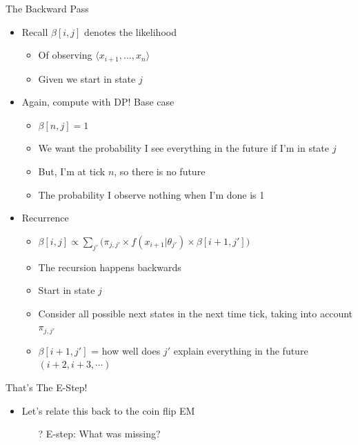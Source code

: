 \documentclass[aspectratio=169]{beamer}
\begin{document}
\begin{frame}{The Backward Pass}

\begin{itemize}
\item Recall $\beta[i,j]$ denotes the likelihood
	\begin{itemize}
	\item Of observing $\langle x_{i+1}, ..., x_n \rangle$
	\item Given we start in state $j$
	\end{itemize}
\item Again, compute with DP! Base case
        \begin{itemize}
        \item $\beta[n,j] = 1$
        \item We want the probability I see everything in the future if I'm in state $j$
        \item But, I'm at tick $n$, so there is no future
        \item The probability I observe nothing when I'm done is 1
        \end{itemize}
\item Recurrence
	\begin{itemize}
	\item $\beta[i,j] \propto \sum_{j'} \Big( \pi_{j,j'} \times f(x_{i+1} | \theta_{j'}) \times \beta[i+1,j'] \Big)$ 
	\item The recursion happens backwards
	\item Start in state $j$ 
	\item Consider all possible next states in the next time tick, taking into account $\pi_{j,j'}$
	\item $\beta[i+1, j']$ = how well does $j'$ explain everything in the future $(i+2, i+3, \cdots)$
	\end{itemize}
\end{itemize}\end{frame}

\begin{frame}{That's The E-Step!}

\begin{itemize}
\item Let's relate this back to the coin flip EM
\begin{itemize}
\item[?] E-step: What was missing? 
\end{itemize}
\end{itemize}
\end{frame}
\end{document}
